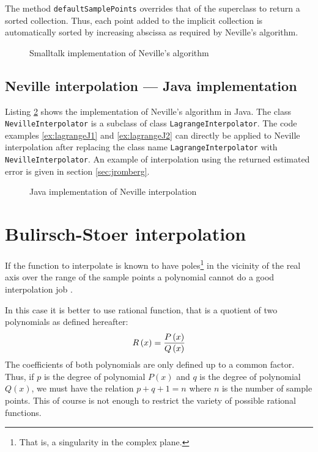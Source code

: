\documentclass[twoside]{book}
\begin{document}
The method {\tt defaultSamplePoints} overrides that of the
superclass to return a sorted collection. Thus, each point added
to the implicit collection is automatically sorted by increasing
abscissa as required by Neville's algorithm.
\begin{figure}\begin{listing} \caption{Smalltalk implementation of Neville's algorithm}
\label{ls:neville}

\end{listing}\end{figure}

\subsection{Neville interpolation --- Java implementation}
Listing \ref{lj:neville} shows the implementation of Neville's
algorithm in Java. The class {\tt NevilleInterpolator} is a
subclass of class {\tt LagrangeInterpolator}. The code examples
\ref{ex:lagrangeJ1} and \ref{ex:lagrangeJ2} can directly be
applied to Neville interpolation after replacing the class name
{\tt LagrangeInterpolator} with {\tt NevilleInterpolator}. An
example of interpolation using the returned estimated error is
given in section \ref{sec:jromberg}.


\begin{figure}\begin{listing} \caption{Java implementation of Neville interpolation}
\label{lj:neville}

\end{listing}\end{figure}

\section{Bulirsch-Stoer interpolation}
If the function to interpolate is known to have
poles\footnote{That is, a singularity in the complex plane.} in
the vicinity of the real axis over the range of the sample points
a polynomial cannot do a good interpolation job \cite{Press}.

In this case it is better to use rational function, that is a
quotient of two polynomials as defined hereafter:
\begin{equation}
R\left(x\right)={P\left(x\right)\over Q\left(x\right)}
\end{equation}
The coefficients of both polynomials are only defined up to a
common factor. Thus, if $p$ is the degree of polynomial
$P\left(x\right)$ and $q$ is the degree of polynomial
$Q\left(x\right)$, we must have the relation $p+q+1 = n$ where $n$
is the number of sample points. This of course is not enough to
restrict the variety of possible rational functions.
\end{document}
